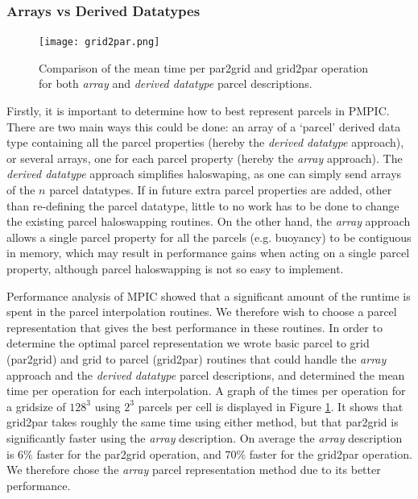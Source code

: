 \documentclass{article}
\begin{document}
\subsubsection{Arrays vs Derived Datatypes}
\begin{figure}
  \begin{center}
    \texttt{[image: grid2par.png]}
    \caption{Comparison of the mean time per par2grid and grid2par operation for both \emph{array} and \emph{derived datatype} parcel descriptions.\label{grid2par_comp}}
  \end{center}
\end{figure}
Firstly, it is important to determine how to best represent parcels in PMPIC. There are two main ways this could be done: an array of a `parcel' derived data type containing all the parcel properties (hereby the \emph{derived datatype} approach), or several arrays, one for each parcel property (hereby the \emph{array} approach). The \emph{derived datatype} approach simplifies haloswaping, as one can simply send arrays of the $n$ parcel datatypes. If in future extra parcel properties are added, other than re-defining the parcel datatype, little to no work has to be done to change the existing parcel haloswapping routines. On the other hand, the \emph{array} approach allows a single parcel property for all the parcels (e.g. buoyancy) to be contiguous in memory, which may result in performance gains when acting on a single parcel property, although parcel haloswapping is not so easy to implement.

Performance analysis of MPIC showed that a significant amount of the runtime is spent in the parcel interpolation routines. We therefore wish to choose a parcel representation that gives the best performance in these routines. In order to determine the optimal parcel representation we wrote basic parcel to grid (par2grid) and grid to parcel (grid2par) routines that could handle the \emph{array} approach and the \emph{derived datatype} parcel descriptions, and determined the mean time per operation for each interpolation. A graph of the times per operation for a gridsize of $128^3$ using $2^3$ parcels per cell is displayed in Figure \ref{grid2par_comp}. It shows that grid2par takes roughly the same time using either method, but that par2grid is significantly faster using the \emph{array} description. On average the \emph{array} description is $6\%$ faster for the par2grid operation, and $70\%$ faster for the grid2par operation. We therefore chose the \emph{array} parcel representation method due to its better performance.
\end{document}
